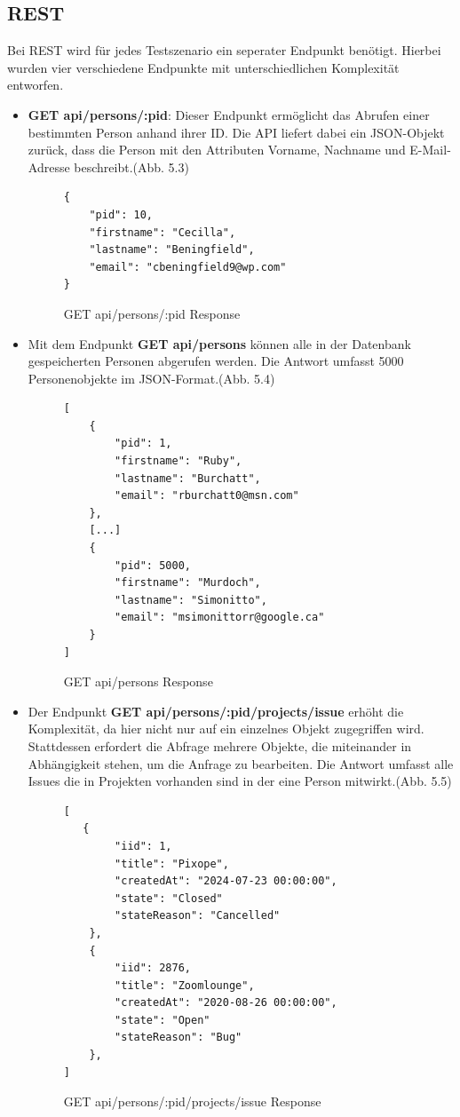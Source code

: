 \subsection{REST}
\label{sec:rest}
Bei REST wird für jedes Testszenario ein seperater Endpunkt benötigt. Hierbei wurden vier verschiedene Endpunkte mit unterschiedlichen Komplexität entworfen.
\begin{itemize}
\item \textbf{GET api/persons/:pid}: Dieser Endpunkt ermöglicht das Abrufen einer bestimmten Person anhand ihrer ID. Die API liefert dabei ein JSON-Objekt zurück, dass die Person mit den Attributen Vorname, Nachname und E-Mail-Adresse beschreibt.(Abb. 5.3)
\begin{figure}[H]
\begin{center}
\begin{BVerbatim}
{
    "pid": 10,
    "firstname": "Cecilla",
    "lastname": "Beningfield",
    "email": "cbeningfield9@wp.com"
}
\end{BVerbatim}
\end{center}
\caption{GET api/persons/:pid Response}
\end{figure}

\item Mit dem Endpunkt  \textbf{GET api/persons} können alle in der Datenbank gespeicherten Personen abgerufen werden. Die Antwort umfasst 5000 Personenobjekte im JSON-Format.(Abb. 5.4)

\begin{figure}[H]
\begin{center}
\begin{BVerbatim}
[
    {
        "pid": 1,
        "firstname": "Ruby",
        "lastname": "Burchatt",
        "email": "rburchatt0@msn.com"
    },
	[...]
    {
        "pid": 5000,
        "firstname": "Murdoch",
        "lastname": "Simonitto",
        "email": "msimonittorr@google.ca"
    }
]
\end{BVerbatim}
\end{center}
\caption{GET api/persons Response}
\end{figure}

\item Der Endpunkt \textbf{GET api/persons/:pid/projects/issue} erhöht die Komplexität, da hier nicht nur auf ein einzelnes Objekt zugegriffen wird. Stattdessen erfordert die Abfrage mehrere Objekte, die miteinander in Abhängigkeit stehen, um die Anfrage zu bearbeiten. Die Antwort umfasst alle Issues die in Projekten vorhanden sind in der eine Person mitwirkt.(Abb. 5.5)
\begin{figure}[H]
\begin{center}
\begin{BVerbatim}
[
   {
        "iid": 1,
        "title": "Pixope",
        "createdAt": "2024-07-23 00:00:00",
        "state": "Closed"
        "stateReason": "Cancelled"
    },
    {
        "iid": 2876,
        "title": "Zoomlounge",
        "createdAt": "2020-08-26 00:00:00",
        "state": "Open"
        "stateReason": "Bug"
    },
]
\end{BVerbatim}
\end{center}
\caption{GET api/persons/:pid/projects/issue Response}
\end{figure}


\end{itemize}
